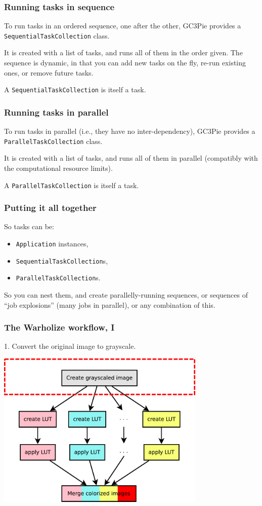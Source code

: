 \documentclass[english,serif,mathserif,usenames,dvipsnames]{beamer}
\begin{document}
\begin{frame}
  \frametitle{Running tasks in sequence}

  To run tasks in an ordered sequence, one after the other, GC3Pie
  provides a \texttt{SequentialTaskCollection} class.

  \+
  It is created with a list of tasks, and runs all of them in the
  order given.  The sequence is dynamic, in that you can add new tasks
  on the fly, re-run existing ones, or remove future tasks.

  \+
  A \texttt{SequentialTaskCollection} is itself a task.
\end{frame}


\begin{frame}
  \frametitle{Running tasks in parallel}

  To run tasks in parallel (i.e., they have no inter-dependency),
  GC3Pie provides a \texttt{ParallelTaskCollection} class.

  \+
  It is created with a list of tasks, and runs all of them
  in parallel (compatibly with the computational resource limits).

  \+
  A \texttt{ParallelTaskCollection} is itself a task.

\end{frame}


\begin{frame}
  \frametitle{Putting it all together}
  So tasks can be:
  \begin{itemize}
  \item \texttt{Application} instances,
  \item \texttt{SequentialTaskCollection}s,
  \item \texttt{ParallelTaskCollection}s.
  \end{itemize}

  \+
  So you can nest them, and create parallelly-running sequences, or
  sequences of ``job explosions'' (many jobs in parallel), or any
  combination of this.
\end{frame}


\begin{frame}
  \frametitle{The Warholize workflow, I}

  1. Convert the original image to grayscale.

  \+
  \includegraphics[width=0.75\textwidth]{fig/warholize-wkf1}
\end{frame}
\end{document}
